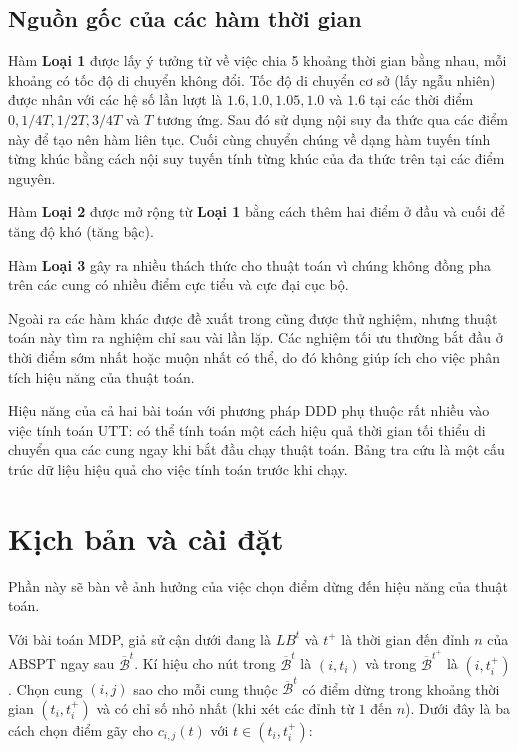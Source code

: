 \documentclass[../main.tex]{subfiles}
\begin{document}
\subsection{Nguồn gốc của các hàm thời
gian}\label{nguux1ed3n-gux1ed1c-cux1ee7a-cuxe1c-huxe0m-thux1eddi-gian}

Hàm \textbf{Loại 1} được lấy ý tưởng từ \cite{figliozzi2012time} về
việc chia 5 khoảng thời gian bằng nhau, mỗi khoảng có tốc độ di chuyển
không đổi. Tốc độ di chuyển cơ sở (lấy ngẫu nhiên) được nhân với các hệ
số lần lượt là \(1.6, 1.0, 1.05, 1.0\) và \(1.6\) tại các thời điểm
\(0, 1/4T, 1/2T, 3/4T\) và \(T\) tương ứng. Sau đó sử dụng nội suy đa
thức qua các điểm này để tạo nên hàm liên tục. Cuối cùng chuyển chúng về
dạng hàm tuyến tính từng khúc bằng cách nội suy tuyến tính từng khúc của
đa thức trên tại các điểm nguyên.

Hàm \textbf{Loại 2} được mở rộng từ \textbf{Loại 1} bằng cách thêm hai
điểm ở đầu và cuối để tăng độ khó (tăng bậc).

Hàm \textbf{Loại 3} gây ra nhiều thách thức cho thuật toán vì chúng
không đồng pha trên các cung có nhiều điểm cực tiểu và cực đại cục bộ.

Ngoài ra các hàm khác được đề xuất trong \cite{figliozzi2012time} cũng
được thử nghiệm, nhưng thuật toán này tìm ra nghiệm chỉ sau vài lần lặp.
Các nghiệm tối ưu thường bắt đầu ở thời điểm sớm nhất hoặc muộn nhất có
thể, do đó không giúp ích cho việc phân tích hiệu năng của thuật toán.

Hiệu năng của cả hai bài toán với phương pháp DDD phụ thuộc rất nhiều
vào việc tính toán UTT: có thể tính toán một cách hiệu quả thời gian tối
thiểu di chuyển qua các cung ngay khi bắt đầu chạy thuật toán. Bảng tra
cứu là một cấu trúc dữ liệu hiệu quả cho việc tính toán trước khi chạy.

\section{Kịch bản và cài
đặt}\label{kux1ecbch-bux1ea3n-vuxe0-cuxe0i-ux111ux1eb7t}

Phần này sẽ bàn về ảnh hưởng của việc chọn điểm dừng đến hiệu năng của
thuật toán.

Với bài toán MDP, giả sử cận dưới đang là \(LB^t\) và \(t^+\) là thời
gian đến đỉnh \(n\) của ABSPT ngay sau \(\overline{\mathcal{B}}^t\). Kí
hiệu cho nút trong \(\overline{\mathcal{B}}^t\) là \((i,t_i)\) và trong
\(\overline{\mathcal{B}}^{t^+}\) là \((i, t_i^+)\). Chọn cung \((i,j)\)
sao cho mỗi cung thuộc \(\overline{\mathcal{B}}^{t}\) có điểm dừng trong
khoảng thời gian \((t_i, t_i^+)\) và có chỉ số nhỏ nhất (khi xét các
đỉnh từ \(1\) đến \(n\)). Dưới đây là ba cách chọn điểm gãy cho
\(c_{i,j}(t)\) với \(t\in (t_i, t_i^+)\):
\end{document}
